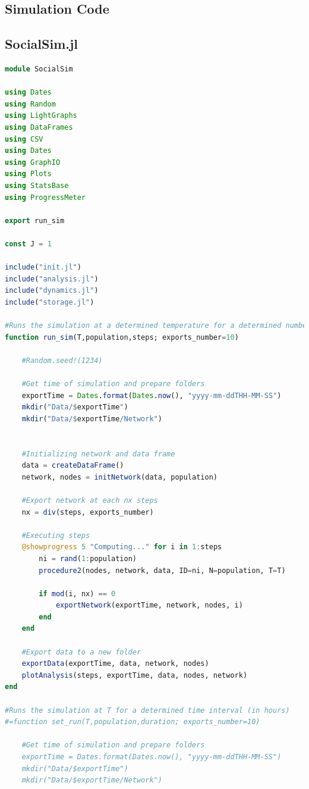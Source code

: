 \documentclass[12pt,openright,twoside]{book}
\begin{document}
\begin{appendices}
\chapter{Simulation Code}

\section{SocialSim.jl}
\begin{lstlisting}[language=julia]
module SocialSim

using Dates
using Random
using LightGraphs
using DataFrames
using CSV
using Dates
using GraphIO
using Plots
using StatsBase
using ProgressMeter

export run_sim

const J = 1

include("init.jl")
include("analysis.jl")
include("dynamics.jl")
include("storage.jl")

#Runs the simulation at a determined temperature for a determined number of steps
function run_sim(T,population,steps; exports_number=10)
    
    #Random.seed!(1234)

    #Get time of simulation and prepare folders
    exportTime = Dates.format(Dates.now(), "yyyy-mm-ddTHH-MM-SS")
    mkdir("Data/$exportTime")
    mkdir("Data/$exportTime/Network")

    
    #Initializing network and data frame
    data = createDataFrame()
    network, nodes = initNetwork(data, population)

    #Export network at each nx steps
    nx = div(steps, exports_number) 

    #Executing steps
    @showprogress 5 "Computing..." for i in 1:steps
        ni = rand(1:population)
        procedure2(nodes, network, data, ID=ni, N=population, T=T)

        if mod(i, nx) == 0
            exportNetwork(exportTime, network, nodes, i)
        end
    end

    #Export data to a new folder
    exportData(exportTime, data, network, nodes)
    plotAnalysis(steps, exportTime, data, nodes, network)
end

#Runs the simulation at T for a determined time interval (in hours)
#=function set_run(T,population,duration; exports_number=10)
    
    #Get time of simulation and prepare folders
    exportTime = Dates.format(Dates.now(), "yyyy-mm-ddTHH-MM-SS")
    mkdir("Data/$exportTime")
    mkdir("Data/$exportTime/Network")
    

\end{lstlisting}
\end{appendices}
\end{document}
